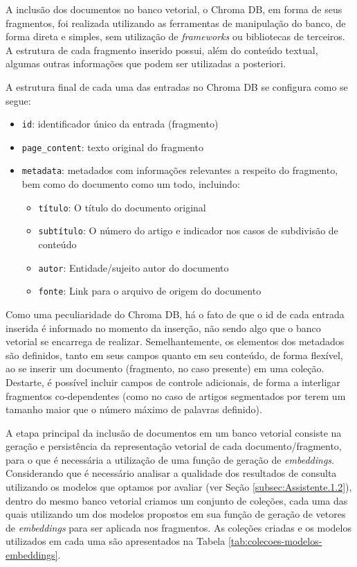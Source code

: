 A inclusão dos documentos no banco vetorial, o Chroma DB, em forma de seus fragmentos, foi realizada utilizando as ferramentas de manipulação do banco, de forma direta e simples, sem utilização de \textit{frameworks} ou bibliotecas de terceiros. A estrutura de cada fragmento inserido possui, além do conteúdo textual, algumas outras informações que podem ser utilizadas a posteriori.

A estrutura final de cada uma das entradas no Chroma DB se configura como se segue:
\begin{itemize}
    \item \texttt{id}: identificador único da entrada (fragmento)
    \item \texttt{page\_content}: texto original do fragmento
    \item \texttt{metadata}: metadados com informações relevantes a respeito do fragmento, bem como do documento como um todo, incluindo:
    \begin{itemize}
        \item \texttt{título}: O título do documento original
        \item \texttt{subtítulo}: O número do artigo e indicador nos casos de subdivisão de conteúdo
        \item \texttt{autor}: Entidade/sujeito autor do documento
        \item \texttt{fonte}: Link para o arquivo de origem do documento
    \end{itemize}
\end{itemize}

Como uma peculiaridade do Chroma DB, há o fato de que o id de cada entrada inserida é informado no momento da inserção, não sendo algo que o banco vetorial se encarrega de realizar. Semelhantemente, os elementos dos metadados são definidos, tanto em seus campos quanto em seu conteúdo, de forma flexível, ao se inserir um documento (fragmento, no caso presente) em uma coleção. Destarte, é possível incluir campos de controle adicionais, de forma a interligar fragmentos co-dependentes (como no caso de artigos segmentados por terem um tamanho maior que o número máximo de palavras definido).

A etapa principal da inclusão de documentos em um banco vetorial consiste na geração e persistência da representação vetorial de cada documento/fragmento, para o que é necessária a utilização de uma função de geração de \textit{embeddings}. Considerando que é necessário analisar a qualidade dos resultados de consulta utilizando os modelos que optamos por avaliar (ver Seção \ref{subsec:Assistente.1.2}), dentro do mesmo banco vetorial criamos um conjunto de coleções, cada uma das quais utilizando um dos modelos propostos em sua função de geração de vetores de \textit{embeddings} para ser aplicada nos fragmentos. As coleções criadas e os modelos utilizados em cada uma são apresentados na Tabela \ref{tab:colecoes-modelos-embeddings}.

